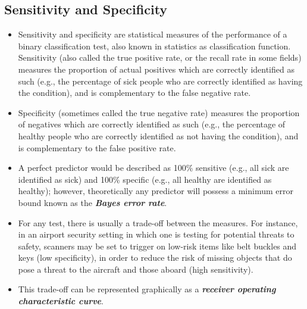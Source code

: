 \documentclass[a4paper,12pt]{article}
\begin{document}
\subsection*{Sensitivity and Specificity}
\begin{itemize}
	\item Sensitivity and specificity are statistical measures of the performance of a binary classification test, also known in statistics as classification function. Sensitivity (also called the true positive rate, or the recall rate in some fields) measures the proportion of actual positives which are correctly identified as such (e.g., the percentage of sick people who are correctly identified as having the condition), and is complementary to the false negative rate.
	\item  Specificity (sometimes called the true negative rate) measures the proportion of negatives which are correctly identified as such (e.g., the percentage of healthy people who are correctly identified as not having the condition), and is complementary to the false positive rate.
	\item A perfect predictor would be described as 100\% sensitive (e.g., all sick are identified as sick) and 100\% specific (e.g., all healthy are identified as healthy); however, theoretically any predictor will possess a minimum error bound known as the \textbf{\textit{Bayes error rate}}.
	\item For any test, there is usually a trade-off between the measures. For instance, in an airport security setting in which one is testing for potential threats to safety, scanners may be set to trigger on low-risk items like belt buckles and keys (low specificity), in order to reduce the risk of missing objects that do pose a threat to the aircraft and those aboard (high sensitivity). 
	\item This trade-off can be represented graphically as a \textbf{\textit{receiver operating characteristic curve}}.
	
\end{itemize}
\end{document}
